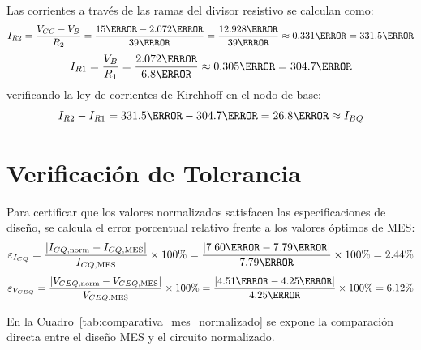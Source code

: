 Las corrientes a través de las ramas del divisor resistivo se calculan como:
\begin{equation}
  I_{R2} = \frac{V_{CC} - V_B}{R_2} = \frac{15\V - 2.072\V}{39\kohm} = \frac{12.928\V}{39\kohm} \approx 0.331\mA = 331.5\uA
\end{equation}
\begin{equation}
  I_{R1} = \frac{V_B}{R_1} = \frac{2.072\V}{6.8\kohm} \approx 0.305\mA = 304.7\uA
\end{equation}
verificando la ley de corrientes de Kirchhoff en el nodo de base:
\begin{equation}
  I_{R2} - I_{R1} = 331.5\uA - 304.7\uA = 26.8\uA \approx I_{BQ}
\end{equation}

\section{Verificación de Tolerancia}

Para certificar que los valores normalizados satisfacen las especificaciones de diseño, se calcula el error
porcentual relativo frente a los valores óptimos de MES:
\begin{equation}
  \varepsilon_{I_{CQ}} = \frac{|I_{CQ,\text{norm}} - I_{CQ,\text{MES}}|}{I_{CQ,\text{MES}}} \times 100\% = \frac{|7.60\mA - 7.79\mA|}{7.79\mA} \times 100\% = 2.44\%
\end{equation}
\begin{equation}
  \varepsilon_{V_{CEQ}} = \frac{|V_{CEQ,\text{norm}} - V_{CEQ,\text{MES}}|}{V_{CEQ,\text{MES}}} \times 100\% = \frac{|4.51\V - 4.25\V|}{4.25\V} \times 100\% = 6.12\%
\end{equation}

En la Cuadro~\ref{tab:comparativa_mes_normalizado} se expone la comparación directa entre el diseño MES y el circuito normalizado.


